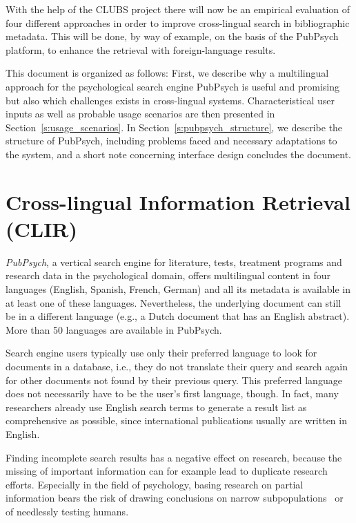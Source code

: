 \documentclass[a4paper,11pt]{article}
\begin{document}
With the help of the CLUBS project there will now be an empirical evaluation of four different approaches in order to improve cross-lingual search in bibliographic metadata. This will be done, by way of example, on the basis of the PubPsych platform, to enhance the retrieval with foreign-language results.

This document is organized as follows: First, we describe why a multilingual approach for the psychological search engine PubPsych is useful and promising but also which challenges exists in cross-lingual systems. Characteristical user inputs as well as probable usage scenarios are then presented in Section~\ref{s:usage_scenarios}. In Section~\ref{s:pubpsych_structure}, we describe the structure of PubPsych, including problems faced and necessary adaptations to the system, and a short note concerning interface design concludes the document.


\section{Cross-lingual Information Retrieval (CLIR)}
\label{s:clir}
\textit{PubPsych}, a vertical search engine for literature, tests, treatment programs and research data in the psychological domain, offers multilingual content in four languages (English, Spanish, French, German) and all its metadata is available in at least one of these languages. Nevertheless, the underlying document can still be in a different language (e.g., a Dutch document that has an English abstract). More than 50 languages are available in PubPsych.

Search engine users typically use only their preferred language to look for documents in a database, i.e., they do not translate their query and search again for other documents not found by their previous query. This preferred language does not necessarily have to be the user's first language, though. In fact, many researchers already use English search terms to generate a result list as comprehensive as possible, since international publications usually are written in English. 

Finding incomplete search results has a negative effect on research, because the missing of important information can for example lead to duplicate research efforts. Especially in the field of psychology, basing research on partial information bears the risk of drawing conclusions on narrow subpopulations~\cite{henrichEtal:2010} or of needlessly testing humans.
\end{document}
